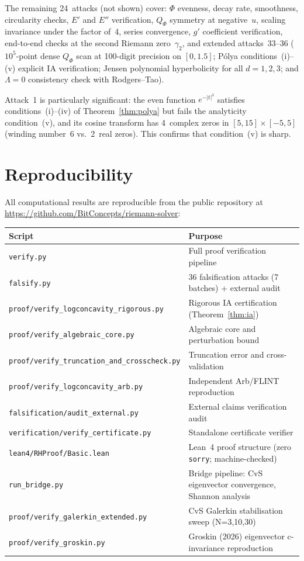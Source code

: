 \documentclass[11pt]{article}
\theoremstyle{definition}
\theoremstyle{remark}
\newcommand{\repourl}{\url{https://github.com/BitConcepts/riemann-solver}}
\begin{document}
The remaining 24~attacks (not shown) cover: $\Phi$ evenness, decay rate, smoothness, circularity checks, $E'$ and $E''$ verification, $Q_\Phi$ symmetry at negative~$u$, scaling invariance under the factor of~4, series convergence, $g'$ coefficient verification, end-to-end checks at the second Riemann zero~$\gamma_2$, and extended attacks~33--36 ($10^5$-point dense $Q_\Phi$ scan at 100-digit precision on $[0, 1.5]$; P\'olya conditions~(i)--(v) explicit IA verification; Jensen polynomial hyperbolicity for all $d = 1, 2, 3$; and $\Lambda = 0$ consistency check with Rodgers--Tao).

Attack~1 is particularly significant: the even function $e^{-|t|^3}$ satisfies conditions~(i)--(iv) of Theorem~\ref{thm:polya} but fails the analyticity condition~(v), and its cosine transform has 4~complex zeros in $[5,15] \times [-5,5]$ (winding number~6 vs.\ 2~real zeros). This confirms that condition~(v) is sharp.

\section{Reproducibility}
\label{sec:reproduce}

All computational results are reproducible from the public repository at \repourl:

\begin{center}
\small
\begin{tabular}{ll}
\toprule
Script & Purpose \\
\midrule
\texttt{verify.py} & Full proof verification pipeline \\
\texttt{falsify.py} & 36 falsification attacks (7 batches) + external audit \\
\texttt{proof/verify\_logconcavity\_rigorous.py} & Rigorous IA certification (Theorem~\ref{thm:ia}) \\
\texttt{proof/verify\_algebraic\_core.py} & Algebraic core and perturbation bound \\
\texttt{proof/verify\_truncation\_and\_crosscheck.py} & Truncation error and cross-validation \\
\texttt{proof/verify\_logconcavity\_arb.py} & Independent Arb/FLINT reproduction \\
\texttt{falsification/audit\_external.py} & External claims verification audit \\
\texttt{verification/verify\_certificate.py} & Standalone certificate verifier \\
\texttt{lean4/RHProof/Basic.lean} & Lean~4 proof structure (zero \texttt{sorry}; machine-checked) \\
\texttt{run\_bridge.py} & Bridge pipeline: CvS eigenvector convergence, Shannon analysis \\
\texttt{proof/verify\_galerkin\_extended.py} & CvS Galerkin stabilisation sweep (N=3,10,30) \\
\texttt{proof/verify\_groskin.py} & Groskin (2026) eigenvector c-invariance reproduction \\
\bottomrule
\end{tabular}
\end{center}
\end{document}
